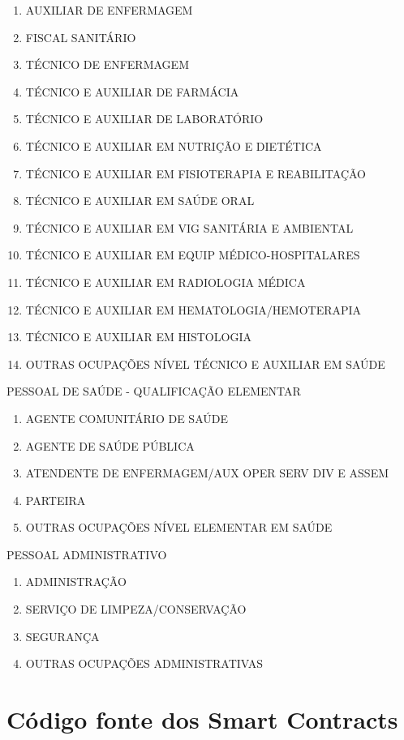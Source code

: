 \documentclass[a4paper,11pt]{article}
\begin{document}
\begin{enumerate}
    \item AUXILIAR DE ENFERMAGEM
    \item FISCAL SANITÁRIO
    \item TÉCNICO DE ENFERMAGEM
    \item TÉCNICO E AUXILIAR DE FARMÁCIA
    \item TÉCNICO E AUXILIAR DE LABORATÓRIO
    \item TÉCNICO E AUXILIAR EM NUTRIÇÃO E DIETÉTICA
    \item TÉCNICO E AUXILIAR EM FISIOTERAPIA E REABILITAÇÃO
    \item TÉCNICO E AUXILIAR EM SAÚDE ORAL
    \item TÉCNICO E AUXILIAR EM VIG SANITÁRIA E AMBIENTAL
    \item TÉCNICO E AUXILIAR EM EQUIP MÉDICO-HOSPITALARES
    \item TÉCNICO E AUXILIAR EM RADIOLOGIA MÉDICA
    \item TÉCNICO E AUXILIAR EM HEMATOLOGIA/HEMOTERAPIA
    \item TÉCNICO E AUXILIAR EM HISTOLOGIA
    \item OUTRAS OCUPAÇÕES NÍVEL TÉCNICO E AUXILIAR EM SAÚDE
\end{enumerate}
PESSOAL DE SAÚDE - QUALIFICAÇÃO ELEMENTAR
\begin{enumerate}
    \item AGENTE COMUNITÁRIO DE SAÚDE
    \item AGENTE DE SAÚDE PÚBLICA
    \item ATENDENTE DE ENFERMAGEM/AUX OPER SERV DIV E ASSEM
    \item PARTEIRA
    \item OUTRAS OCUPAÇÕES NÍVEL ELEMENTAR EM SAÚDE
\end{enumerate}
PESSOAL ADMINISTRATIVO
\begin{enumerate}
    \item ADMINISTRAÇÃO
    \item SERVIÇO DE LIMPEZA/CONSERVAÇÃO
    \item SEGURANÇA
    \item OUTRAS OCUPAÇÕES ADMINISTRATIVAS
\end{enumerate}

\newpage
\section{Código fonte dos Smart Contracts}
\end{document}
